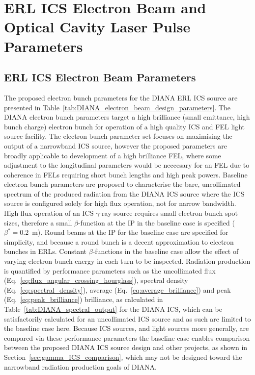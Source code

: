 \documentclass[../main.tex]{subfiles}
\begin{document}
\section{ERL ICS Electron Beam and Optical Cavity Laser Pulse Parameters}

\subsection{ERL ICS Electron Beam Parameters }
\label{sec:DIANA_electron_parameters}

The proposed electron bunch parameters for the DIANA ERL ICS source are presented in Table~\ref{tab:DIANA_electron_beam_design_parameters}. The DIANA electron bunch parameters target a high brilliance (small emittance, high bunch charge) electron bunch for operation of a high quality ICS and FEL light source facility. The electron bunch parameter set focuses on maximising the output of a narrowband ICS source, however the proposed parameters are broadly applicable to development of a high brilliance FEL, where some adjustment to the longitudinal parameters would be neccesary for an FEL due to coherence in FELs requiring short bunch lengths and high peak powers.    
Baseline electron bunch parameters are proposed to characterise the bare, uncollimated spectrum of the produced radiation from the DIANA ICS source where the ICS source is configured solely for high flux operation, not for narrow bandwidth. High flux operation of an ICS $\gamma$-ray source requires small electron bunch spot sizes, therefore a small $\beta$-function at the IP in the baseline case is specified ($\beta^{*}=0.2$~\si{\meter}). Round beams at the IP for the baseline case are specified for simplicity, and because a round bunch is a decent approximation to electron bunches in ERLs. Constant $\beta$-functions in the baseline case allow the effect of varying electron bunch energy in each turn to be inspected. Radiation production is quantified by performance parameters such as the uncollimated flux (Eq.~\ref{eq:flux_angular_crossing_hourglass}), spectral density (Eq.~\ref{eq:spectral_density}), average (Eq.~\ref{eq:average_brilliance}) and peak (Eq.~\ref{eq:peak_brilliance}) brilliance, as calculated in Table~\ref{tab:DIANA_spectral_output} for the DIANA ICS, which can be satisfactorily calculated for an uncollimated ICS source and as such are limited to the baseline case here. Because ICS sources, and light sources more generally, are compared via these performance parameters the baseline case enables comparison between the proposed DIANA ICS source design and other projects, as shown in Section~\ref{sec:gamma_ICS_comparison}, which may not be designed toward the narrowband radiation production goals of DIANA.
\end{document}
